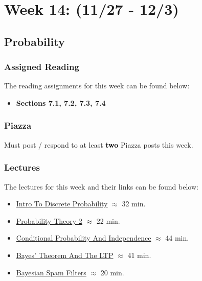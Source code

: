 \clearpage
\chapter{Week 14: (11/27 - 12/3)}

\section{Probability}

\subsection{Assigned Reading}

The reading assignments for this week can be found below:

\begin{itemize}
    \item \textbf{Sections 7.1, 7.2, 7.3, 7.4}
\end{itemize}

\subsection{Piazza}

Must post / respond to at least \textbf{two} Piazza posts this week.  

\subsection{Lectures}

The lectures for this week and their links can be found below:

\begin{itemize}
    \item \href{https://applied.cs.colorado.edu/mod/hvp/view.php?id=51840}{Intro To Discrete Probability} $\approx$ 32 min.
    \item \href{https://applied.cs.colorado.edu/mod/hvp/view.php?id=51841}{Probability Theory 2} $\approx$ 22 min.
    \item \href{https://applied.cs.colorado.edu/mod/hvp/view.php?id=51842}{Conditional Probability And Independence} $\approx$ 44 min.
    \item \href{https://applied.cs.colorado.edu/mod/hvp/view.php?id=51843}{Bayes' Theorem And The LTP} $\approx$ 41 min.
    \item \href{https://applied.cs.colorado.edu/mod/hvp/view.php?id=51844}{Bayesian Spam Filters} $\approx$ 20 min.
\end{itemize}

